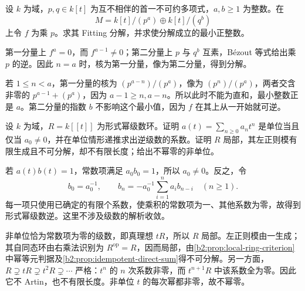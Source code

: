 \begin{exercise}\label{b2:ex:12-fitting-polynomial}
	设 \(k\) 为域，\(p,q\in k[t]\) 为互不相伴的首一不可约多项式，\(a,b\ge1\) 为整数。在
	\[
		M=k[t]/(p^a)\oplus k[t]/(q^b)
	\]
	上令 \(f\) 为乘 \(p\)。求其 Fitting 分解，并求使分解成立的最小正整数。
\end{exercise}
\begin{solution}
	第一分量上 \(f^a=0\)，而 \(f^{a-1}\ne0\)；第二分量上 \(p\) 与 \(q^b\) 互素，Bézout 等式给出乘 \(p\) 的逆。因此 \(n=a\) 时，核为第一分量，像为第二分量，得到分解。

	若 \(1\le n<a\)，第一分量的核为 \((p^{a-n})/(p^a)\)，像为 \((p^n)/(p^a)\)，两者交含非零的 \(p^{a-1}+(p^a)\)，因为 \(a-1\ge n,a-n\)。所以此时不能为直和，最小整数正是 \(a\)。第二分量的指数 \(b\) 不影响这个最小值，因为 \(f\) 在其上从一开始就可逆。
\end{solution}

\begin{exercise}\label{b2:ex:12-local-not-finite-length}
	设 \(k\) 为域，\(R=k[\![t]\!]\) 为形式幂级数环。证明 \(a(t)=\sum_{n\ge0}a_nt^n\) 是单位当且仅当 \(a_0\ne0\)，并在单位情形递推求出逆级数的系数。证明 \(R\) 局部，其左正则模有限生成且不可分解，却不有限长度；给出不幂零的非单位。
\end{exercise}
\begin{solution}
	若 \(a(t)b(t)=1\)，常数项满足 \(a_0b_0=1\)，所以 \(a_0\ne0\)。反之，令
	\[
		b_0=a_0^{-1},\qquad b_n=-a_0^{-1}\sum_{i=1}^n a_i b_{n-i}\quad(n\ge1).
	\]
	每一项只使用已确定的有限个系数，使乘积的常数项为一、其他系数为零，故得到形式幂级数逆。这里不涉及级数的解析收敛。

	非单位恰为常数项为零的级数，即真理想 \(tR\)，所以 \(R\) 局部。左正则模由一生成；其自同态环由右乘法识别为 \(R^{\mathrm{op}}=R\)，因而局部，由\cref{b2:prop:local-ring-criterion}中幂等元判据及\cref{b2:prop:idempotent-direct-sum}得不可分解。另一方面，\(R\supsetneq tR\supsetneq t^2R\supsetneq\cdots\) 严格：\(t^n\) 的 \(n\) 次系数非零，而 \(t^{n+1}R\) 中该系数全为零。因此它不 Artin，也不有限长度。非单位 \(t\) 的每次幂都非零，故不幂零。
\end{solution}

